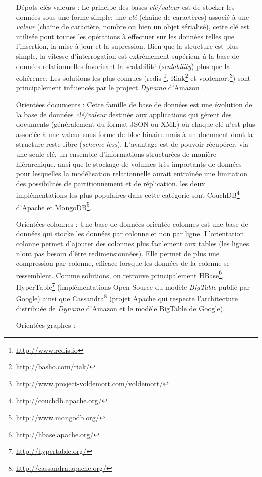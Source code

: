 \begin{itemize}
\item [Dépots clés-valeurs]: Le principe des bases \textit{clé/valeur}
  est de stocker les données sous une forme simple: une \emph{clé }
  (chaîne de caractères) associé à une \emph{valeur} (chaîne de
  caractère, nombre ou bien un objet sérialisé), cette clé est
  utilisée pout toutes les opérations à effectuer sur les données
  telles que l'insertion, la mise à jour et la supression. Bien que la
  structure est plus simple, la vitesse d'interrogation est
  extrêmement supérieur à la base de données relationnelles favorisant
  la scalabilité (\emph{scalability}) plus que la cohérence. Les
  solutions les plus connues (redis
  \footnote{\url{http://www.redis.io}},
  Riak\footnote{\url{http://basho.com/riak/}} et
  voldemort\footnote{\url{http://www.project-voldemort.com/voldemort/}})
  sont principalement influencés par le project \emph{Dynamo} d'Amazon
  \cite{decandia2007dynamo}.

\item [Orientées documents]: Cette famille de base de données est une
  évolution de la base de données \textit{clé/valeur} destinée aux
  applications qui gèrent des documents (généralement du format
  \textsc{JSON} ou \textsc{XML}) où chaque clé n'est plus associée à
  une valeur sous forme de bloc binaire mais à un document dont la
  structure reste libre (\textit{scheme-less}). L'avantage est de
  pouvoir récupérer, via une seule clé, un ensemble d’informations
  structurées de manière hiérarchique. ansi que le stockage de volumes
  très importants de données pour lesquelles la modélisation
  relationnelle aurait entraînée une limitation des possibilités de
  partitionnement et de réplication. les deux implémentations les plus
  populaires dans cette catégorie sont
  CouchDB\footnote{\url{http://couchdb.apache.org/}} d'Apache et
  MongoDB\footnote{\url{http://www.mongodb.org/}}.

  \item [Orientées colonnes]: Une base de données orientée colonnes
    est une base de données qui stocke les données par colonne et non
    par ligne. L'orientation colonne permet d'ajouter des colonnes
    plus facilement aux tables (les lignes n'ont pas besoin d'être
    redimensionnées). Elle permet de plus une compression par colonne,
    efficace lorsque les données de la colonne se ressemblent. Comme
    solutions, on retrouve principalement
    HBase\footnote{\url{http://hbase.apache.org/}},
    HyperTable\footnote{\url{http://hypertable.org/}} (implémentations
    Open Source du modèle \emph{BigTable} \cite{chang2008bigtable}
    publié par Google) ainsi que
    Cassandra\footnote{\url{http://cassandra.apache.org/}} (projet
    Apache qui respecte l'architecture distribuée de \emph{Dynamo}
    \cite{decandia2007dynamo} d'Amazon et le modèle BigTable de
    Google).

  \item [Orientées graphes]: %
  \end{itemize}

